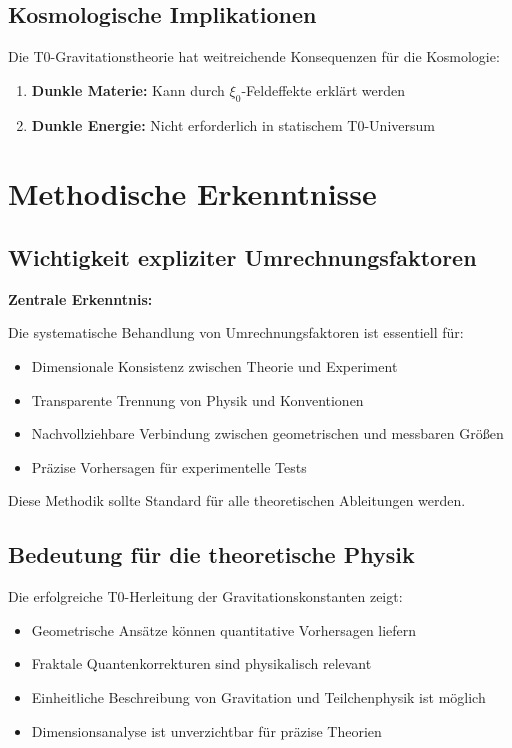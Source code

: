 	\subsection{Kosmologische Implikationen}
	
	Die T0-Gravitationstheorie hat weitreichende Konsequenzen für die Kosmologie:
	
	\begin{enumerate}
		\item \textbf{Dunkle Materie:} Kann durch $\xi_0$-Feldeffekte erklärt werden
		\item \textbf{Dunkle Energie:} Nicht erforderlich in statischem T0-Universum
	\end{enumerate}
	
	\section{Methodische Erkenntnisse}
	
	\subsection{Wichtigkeit expliziter Umrechnungsfaktoren}
	
	\begin{keyresult}
		\textbf{Zentrale Erkenntnis:}
		
		Die systematische Behandlung von Umrechnungsfaktoren ist essentiell für:
		\begin{itemize}
			\item Dimensionale Konsistenz zwischen Theorie und Experiment
			\item Transparente Trennung von Physik und Konventionen
			\item Nachvollziehbare Verbindung zwischen geometrischen und messbaren Größen
			\item Präzise Vorhersagen für experimentelle Tests
		\end{itemize}
		
		Diese Methodik sollte Standard für alle theoretischen Ableitungen werden.
	\end{keyresult}
	
	\subsection{Bedeutung für die theoretische Physik}
	
	Die erfolgreiche T0-Herleitung der Gravitationskonstanten zeigt:
	\begin{itemize}
		\item Geometrische Ansätze können quantitative Vorhersagen liefern
		\item Fraktale Quantenkorrekturen sind physikalisch relevant
		\item Einheitliche Beschreibung von Gravitation und Teilchenphysik ist möglich
		\item Dimensionsanalyse ist unverzichtbar für präzise Theorien
	\end{itemize}
	